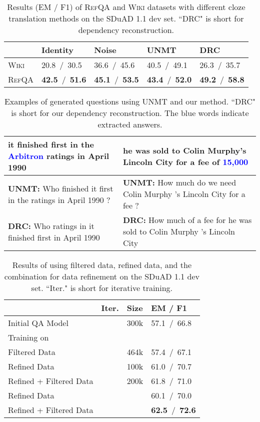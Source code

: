 \documentclass[11pt,a4paper]{article}
\newcommand\refqa{\textsc{RefQA}}
\newcommand{\cmark}{\ding{51}}\newcommand{\xmark}{\ding{55}}
\begin{document}
\begin{table}[t]
\small
\centering
\begin{tabular}{p{0.8cm}p{1.1cm}<{\centering}p{1.1cm}<{\centering}p{1.1cm}<{\centering}p{1.2cm}<{\centering}}
\toprule
& Identity & Noise & UNMT & DRC \\
\midrule
\textsc{Wiki} & 20.8~/~30.5 & 36.6~/~45.6 & 40.5~/~49.1 & 26.3~/~35.7 \\
\refqa{} & \textbf{42.5}~/~\textbf{51.6} &  \textbf{45.1}~/~\textbf{53.5} 
& \textbf{43.4}~/~\textbf{52.0} & \textbf{49.2}~/~\textbf{58.8} \\
\bottomrule
\end{tabular}
\caption{Results (EM / F1) of \refqa{} and \textsc{Wiki} datasets with different cloze translation methods on the SDuAD 1.1 dev set. ``DRC" is short for dependency reconstruction.}
\label{tab:ref&top}
\end{table}

\begin{table}[t]
\small
\centering
\begin{tabular}{p{3.2cm}|p{3.2cm}}
\toprule
it finished first in the \textcolor{blue}{Arbitron} ratings in April 1990 & he was sold to Colin Murphy's Lincoln City for a fee of \textcolor{blue}{15,000} \\ 
\midrule
\textbf{UNMT:} Who finished it first in the ratings in April 1990 ? & \textbf{UNMT:} How much do we need Colin Murphy 's Lincoln City for a fee ? \\ 
\textbf{DRC:} Who ratings in it finished first in April 1990 & \textbf{DRC:} How much of a fee for he was sold to Colin Murphy 's Lincoln City \\
\bottomrule
\end{tabular}
\caption{Examples of generated questions using UNMT and our method. ``DRC" is short for our dependency reconstruction. The blue words indicate extracted answers.}
    \label{tab:example_q}
\end{table}

\begin{table}[t]
\small
\centering
\begin{tabular}{p{3.3cm}p{0.4cm}<{\centering}p{0.9cm}<{\centering}p{1.3cm}<{\centering}}
\toprule
 & Iter.  &  Size  & EM / F1   \\ \midrule
Initial QA Model  & &  300k       & 57.1~/~66.8 \\ \midrule
Training on \\
\quad Filtered Data & \xmark & 464k & 57.4~/~67.1 \\
\quad Refined Data & \xmark & 100k  & 61.0~/~70.7 \\ 
\quad Refined + Filtered Data & \xmark & 200k & 61.8~/~71.0 \\
\quad Refined Data & \cmark &  & 60.1~/~70.0 \\
\quad  Refined + Filtered Data & \cmark  &  & \textbf{62.5}~/~\textbf{72.6} \\ 
\bottomrule
\end{tabular}
\caption{Results of using filtered data, refined data, and the combination for data refinement on the SDuAD 1.1 dev set. ``Iter." is short for iterative training.}
\label{tab:merge}
\end{table}
\end{document}
